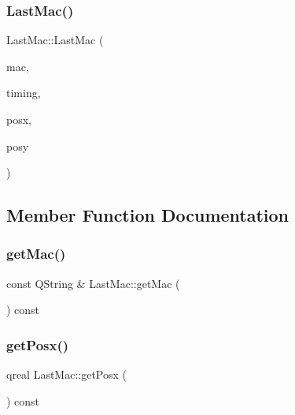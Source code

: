 \mbox{\label{class_last_mac_a10da31c93b21b164eabfb3a91dea7bd2}} 
\subsubsection{\texorpdfstring{Last\+Mac()}{LastMac()}\hspace{0.1cm}{\footnotesize\ttfamily [2/2]}}
{\footnotesize\ttfamily Last\+Mac\+::\+Last\+Mac (\begin{DoxyParamCaption}\item[{const Q\+String \&}]{mac,  }\item[{const Q\+Date\+Time \&}]{timing,  }\item[{qreal}]{posx,  }\item[{qreal}]{posy }\end{DoxyParamCaption})}



\subsection{Member Function Documentation}
\mbox{\label{class_last_mac_a334e24e1707bc7abd20c20248d01e80b}} 
\subsubsection{\texorpdfstring{get\+Mac()}{getMac()}}
{\footnotesize\ttfamily const Q\+String \& Last\+Mac\+::get\+Mac (\begin{DoxyParamCaption}{ }\end{DoxyParamCaption}) const}

\mbox{\label{class_last_mac_a0e1eaeafbd129715fd9b2bfdb6ca1e29}} 
\subsubsection{\texorpdfstring{get\+Posx()}{getPosx()}}
{\footnotesize\ttfamily qreal Last\+Mac\+::get\+Posx (\begin{DoxyParamCaption}{ }\end{DoxyParamCaption}) const}


